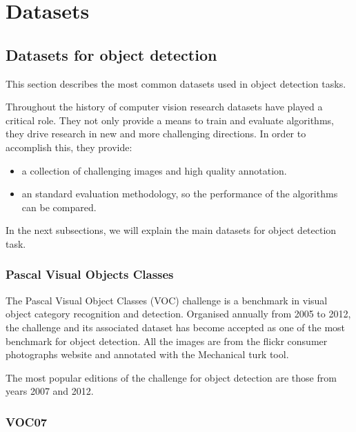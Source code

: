 \documentclass[12pt, a4paper, titlepage,twoside,openright]{article}
\begin{document}
\section{Datasets}



\subsection{Datasets for object detection}

This section describes the most common datasets used in object detection tasks.

Throughout the history of computer vision research datasets have played a critical role.  They not only provide a means to train and evaluate algorithms, they drive research in new and more challenging directions. In order to accomplish this, they provide:


\begin{itemize}

\item a collection of challenging images and high quality annotation.

\item an standard evaluation methodology, so the performance of the algorithms can be compared. 


\end{itemize}



In the next subsections, we will explain the main datasets for object detection task.


\subsubsection{Pascal Visual Objects Classes}

The Pascal Visual Object Classes (VOC) challenge  \cite{voc07} is a benchmark in visual object category recognition and detection. Organised annually from 2005 to 2012, the challenge and its associated dataset has become accepted as one of the most benchmark for object detection. All the images are from the flickr consumer photographs website and annotated with the Mechanical turk tool.

The most popular editions of the challenge for object detection are those from years 2007 and 2012.

\subsubsection{VOC07}
\end{document}
